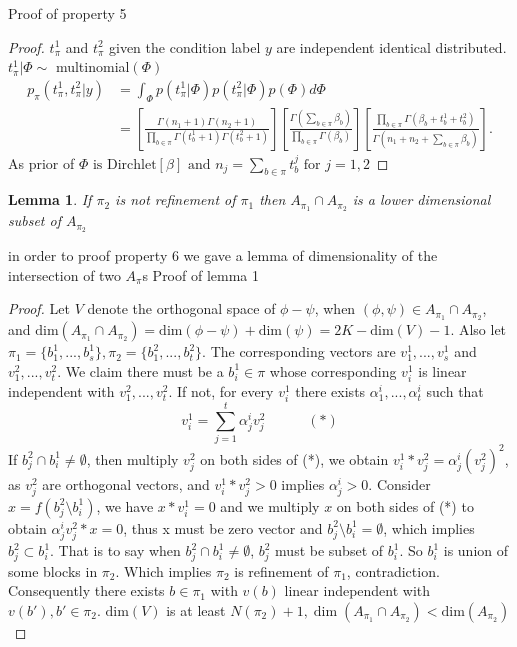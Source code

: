 \documentclass[aoas,preprint]{imsart}
\newtheorem{lemma}{Lemma}
\begin{document}
Proof of property 5
\begin{proof}
$t_\pi^1$ and $t_\pi^2$ given the condition label $y$ are independent identical distributed. $t_\pi^1 |\Phi \sim$ multinomial$(\Phi)$
\begin{align*}
p_\pi(t^1_{\pi},t^2_{\pi}| y) &= \int_\Phi p(t_\pi^1 | \Phi) p(t_\pi^2 | \Phi) p(\Phi) d\Phi \\
&= \left[ \frac{ \Gamma(n_1+1) \Gamma(n_2+1) }{ \prod_{b \in \pi} \Gamma(t^1_b+1) 
   \Gamma( t^2_b + 1 )} \right] 
\left[ \frac{\Gamma( \sum_{b \in \pi} \beta_b  )}{
   \prod_{b \in \pi} \Gamma(\beta_b )} \right] 
 \left[ \frac{ \prod_{b \in \pi} \Gamma( \beta_b + t^1_b + t^2_b )}{
	\Gamma( n_1 + n_2 + \sum_{b \in \pi} \beta_b  )} \right].
\end{align*}
As prior of $\Phi \text{ is Dirchlet}[ \beta ] \text{ and } n_j = \sum_{b \in \pi} t_b^j \text{ for } j = 1,2$
\end{proof}



\begin{lemma}
If $\pi_2$ is not refinement of $\pi_1$ then $A_{\pi_1} \cap A_{\pi_2}$ is a lower dimensional subset of $A_{\pi_2}$
\end{lemma}

in order to proof property 6 we gave a lemma of dimensionality of the intersection of two $A_\pi$s 
Proof of lemma 1
\begin{proof}
Let $V$ denote the orthogonal space of $\phi - \psi$, when $(\phi,\psi)\in A_{\pi_1} \cap A_{\pi_2}$, and $\text{dim}(A_{\pi_1} \cap A_{\pi_2}) = \text{dim}(\phi - \psi) + \text{dim}(\psi) = 2K - \text{dim}(V) - 1$. Also let $\pi_1 = \{b_1^1,...,b_s^1\}, \pi_2 = \{b_1^2,...,b_t^2\}$. The corresponding vectors are $v_1^1,...,v_s^1$ and $v_1^2,...,v_t^2$. We claim there must be a $b_i^1\in \pi$ whose corresponding $v_i^1$ is linear independent with $v_1^2,...,v_t^2$. If not, for every $v_i^1$ there exists $\alpha_1^i,...,\alpha_t^i$ such that 
\[
v_i^1 = \sum_{j = 1}^t \alpha_j^i v_j^2 \quad\quad\quad(*)
\]
If $b_j^2 \cap b_i^1 \neq \emptyset$, then multiply $v_j^2$ on both sides of (*), we obtain $v_i^1 * v_j^2 = \alpha_j^i (v_j^2)^2$, as $v_j^2$ are orthogonal vectors, and $v_i^1 * v_j^2 > 0$ implies $\alpha_j^i > 0$. Consider $x = f(b_j^2\setminus b_i^1)$, we have $x*v_i^1 = 0$ and we multiply $x$ on both sides of (*) to obtain $\alpha_j^i v_j^2*x = 0$, thus x must be zero vector and $b_j^2\setminus b_i^1= \emptyset$, which implies $b_j^2 \subset b_i^1$. That is to say when $b_j^2 \cap b_i^1 \neq \emptyset$, $b_j^2$ must be subset of $b_i^1$. So $b_i^1$ is union of some blocks in $\pi_2$. Which implies $\pi_2$ is refinement of $\pi_1$, contradiction.\\
Consequently there exists $b\in\pi_1$ with $v(b)$ linear independent with $v(b'), b'\in\pi_2$. $\text{dim}(V)$ is at least $N(\pi_2) + 1, \dim(A_{\pi_1} \cap A_{\pi_2}) < \text{dim}(A_{\pi_2})$
\end{proof}
\end{document}

